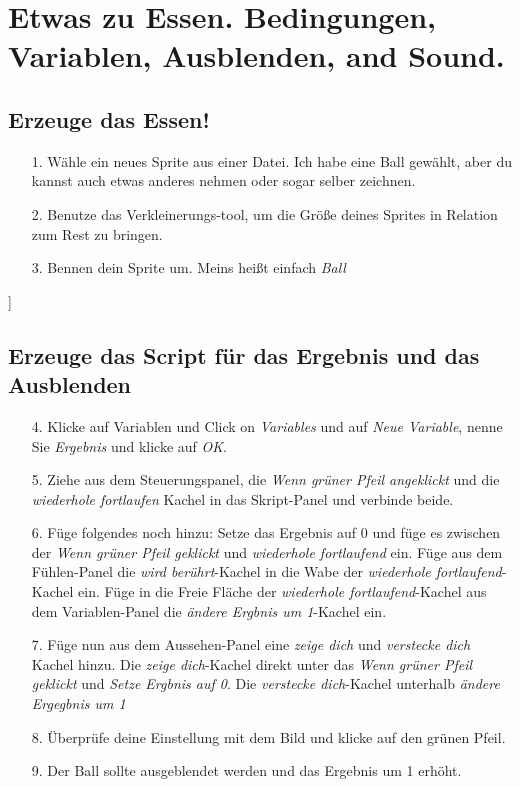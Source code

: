 \section{Etwas zu Essen. Bedingungen, Variablen, Ausblenden, and Sound.}

\subsection{Erzeuge das Essen!}
\begin{itemize}

\item[1.] Wähle ein neues Sprite aus einer Datei. Ich habe eine Ball gewählt, aber du kannst auch etwas anderes nehmen oder sogar selber zeichnen.
\item[2.] Benutze das Verkleinerungs-tool, um die Größe deines Sprites in Relation zum Rest zu bringen.
\item[3.] Bennen dein Sprite um. Meins heißt einfach \textit{Ball}
\end{itemize}]

\subsection{Erzeuge das Script für das Ergebnis und das Ausblenden}

\begin{itemize}
\item[4.] Klicke auf Variablen und Click on \textit{Variables} und auf \textit{Neue Variable}, nenne Sie \textit{Ergebnis} und klicke auf \textit{OK}.
\item[5.] Ziehe aus dem Steuerungspanel, die \textit{Wenn grüner Pfeil angeklickt} und die \textit{wiederhole fortlaufen} Kachel in das Skript-Panel und verbinde beide.
\item[6.] Füge folgendes noch hinzu:
\subitem Setze das Ergebnis auf 0 und füge es zwischen der \textit{Wenn grüner Pfeil geklickt} und \textit{wiederhole fortlaufend} ein.
\subitem Füge aus dem Fühlen-Panel die \textit{wird berührt}-Kachel in die Wabe der \textit{wiederhole fortlaufend}-Kachel ein.
\subitem Füge in die Freie Fläche der \textit{wiederhole fortlaufend}-Kachel aus dem Variablen-Panel die \textit{ändere Ergbnis um 1}-Kachel ein.
\item[7.] Füge nun aus dem Aussehen-Panel eine \textit{zeige dich} und \textit{verstecke dich} Kachel hinzu.
\subitem Die \textit{zeige dich}-Kachel direkt unter das \textit{Wenn grüner Pfeil geklickt} und \textit{Setze Ergbnis auf 0}.
\subitem Die \textit{verstecke dich}-Kachel unterhalb \textit{ändere Ergegbnis um 1}
\item[8.] Überprüfe deine Einstellung mit dem Bild und klicke auf den grünen Pfeil.
\item[9.] Der Ball sollte ausgeblendet werden und das Ergebnis um 1 erhöht.
\end{itemize}

